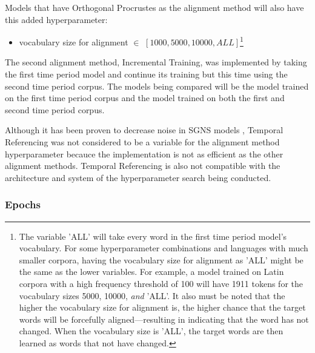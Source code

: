 Models that have Orthogonal Procrustes as the alignment method will also have this added hyperparameter:
\begin{itemize}
    \item vocabulary size for alignment $\in$ $[1000, 5000, 10000, ALL]$\footnote{The variable 'ALL' will take every word in the first time period model's vocabulary. For some hyperparameter combinations and languages with much smaller corpora, having the vocabulary size for alignment as 'ALL' might be the same as the lower variables. For example, a model trained on Latin corpora with a high frequency threshold of 100 will have 1911 tokens for the vocabulary sizes 5000, 10000, \emph{and} 'ALL'. It also must be noted that the higher the vocabulary size for alignment is, the higher chance that the target words will be forcefully aligned—resulting in indicating that the word has not changed. When the vocabulary size is 'ALL', the target words are then learned as words that not have changed.} 
\end{itemize}%


The second alignment method, Incremental Training, was implemented by taking the first time period model and continue its training but this time using the second time period corpus. The models being compared will be the model trained on the first time period corpus and the model trained on both the first and second time period corpus.

Although it has been proven to decrease noise in SGNS models \citep{dubossarsky-etal-2019-time}, Temporal Referencing was not considered to be a variable for the alignment method hyperparameter becauce the implementation is not as efficient as the other alignment methods. Temporal Referencing is also not compatible with the architecture and system of the hyperparameter search being conducted. 


\subsubsection{Epochs} 
\label{exp-epochs}

